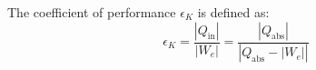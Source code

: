 The coefficient of performance \( \epsilon_K \) is defined as:  
\[
\epsilon_K = \frac{\left| Q_{\text{in}} \right|}{\left| W_e \right|} = \frac{\left| Q_{\text{abs}} \right|}{\left| Q_{\text{abs}} - \left| W_e \right| \right|}
\]